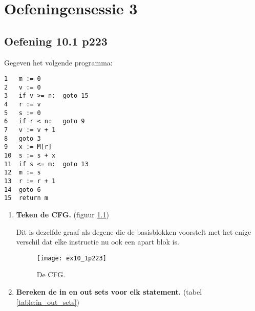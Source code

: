 \chapter{Oefeningensessie 3}


\section{Oefening 10.1 p223}

Gegeven het volgende programma:
\begin{lstlisting}
1	m := 0
2	v := 0
3	if v >= n: 	goto 15
4	r := v
5 	s := 0
6	if r < n: 	goto 9
7	v := v + 1
8	goto 3
9	x := M[r]
10	s := s + x
11	if s <= m:	goto 13
12	m := s
13	r := r + 1
14 	goto 6
15 	return m
\end{lstlisting}

\begin{enumerate}
	\item \textbf{Teken de CFG.} (figuur \ref{fig:ex10_1p223})
	
	Dit is dezelfde graaf als degene die de basisblokken voorstelt met het enige verschil dat elke instructie nu ook een apart blok is. 
	\begin{figure}[ht]
		\centering
		\texttt{[image: ex10\_1p223]}
		\caption{De CFG.}
		\label{fig:ex10_1p223}
	\end{figure}
	\item \textbf{Bereken de in en out sets voor elk statement.} (tabel \ref{table:in_out_sets})
	

\end{enumerate}
